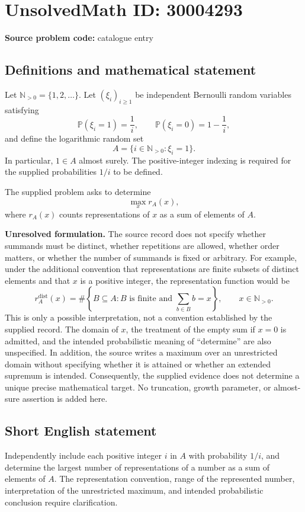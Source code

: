 \documentclass[11pt]{article}
\newcommand{\N}{\mathbb{N}}
\begin{document}
\section*{UnsolvedMath ID: 30004293}
\textbf{Source problem code:} catalogue entry
\subsection{Definitions and mathematical statement}
Let \(\N_{>0}=\{1,2,\ldots\}\). Let \((\xi_i)_{i\geq1}\) be independent Bernoulli random variables satisfying
\[
\mathbb P(\xi_i=1)=\frac1i,\qquad \mathbb P(\xi_i=0)=1-\frac1i,
\]
and define the logarithmic random set
\[
A=\{i\in\N_{>0}:\xi_i=1\}.
\]
In particular, \(1\in A\) almost surely. The positive-integer indexing is required for the supplied probabilities \(1/i\) to be defined.

The supplied problem asks to determine
\[
\max_x r_A(x),
\]
where \(r_A(x)\) counts representations of \(x\) as a sum of elements of \(A\).

\textbf{Unresolved formulation.} The source record does not specify whether summands must be distinct, whether repetitions are allowed, whether order matters, or whether the number of summands is fixed or arbitrary. For example, under the additional convention that representations are finite subsets of distinct elements and that \(x\) is a positive integer, the representation function would be
\[
r_A^{\mathrm{dist}}(x)=\#\left\{B\subseteq A: B\text{ is finite and }\sum_{b\in B}b=x\right\},\qquad x\in\N_{>0}.
\]
This is only a possible interpretation, not a convention established by the supplied record. The domain of \(x\), the treatment of the empty sum if \(x=0\) is admitted, and the intended probabilistic meaning of ``determine'' are also unspecified. In addition, the source writes a maximum over an unrestricted domain without specifying whether it is attained or whether an extended supremum is intended. Consequently, the supplied evidence does not determine a unique precise mathematical target. No truncation, growth parameter, or almost-sure assertion is added here.
\subsection{Short English statement}
Independently include each positive integer \(i\) in \(A\) with probability \(1/i\), and determine the largest number of representations of a number as a sum of elements of \(A\). The representation convention, range of the represented number, interpretation of the unrestricted maximum, and intended probabilistic conclusion require clarification.
\end{document}
